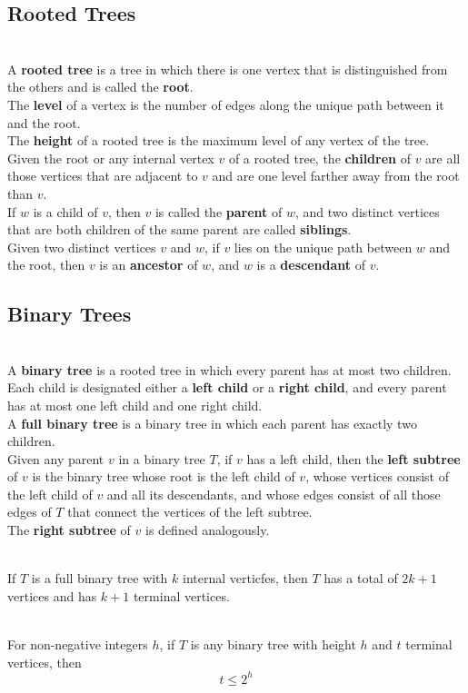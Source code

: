 \documentclass[12pt]{article}
\begin{document}
\subsection{Rooted Trees}
\begin{definition}
\hfill\\
\normalfont A \textbf{rooted tree} is a tree in which there is one vertex that is distinguished from the others and is called the \textbf{root}.\\
The \textbf{level} of a vertex is the number of edges along the unique path between it and the root.\\
The \textbf{height} of a rooted tree is the maximum level of any vertex of the tree.\\
Given the root or any internal vertex $v$ of a rooted tree, the \textbf{children} of $v$ are all those vertices that are adjacent to $v$ and are one level farther away from the root than $v$.\\
If $w$ is a child of $v$, then $v$ is called the \textbf{parent} of $w$, and two distinct vertices that are both children of the same parent are called \textbf{siblings}.\\
Given two distinct vertices $v$ and $w$, if $v$ lies on the unique path between $w$ and the root, then $v$ is an \textbf{ancestor} of $w$, and $w$ is a \textbf{descendant} of $v$.
\end{definition}
\subsection{Binary Trees}
\begin{definition}
\hfill\\
\normalfont A \textbf{binary tree} is a rooted tree in which every parent has at most two children. Each child is designated either a \textbf{left child} or a \textbf{right child}, and every parent has at most one left child and one right child.\\
A \textbf{full binary tree} is a binary tree in which each parent has exactly two children.\\
Given any parent $v$ in a binary tree $T$, if $v$ has a left child, then the \textbf{left subtree} of $v$ is the binary tree whose root is the left child of $v$, whose vertices consist of the left child of $v$ and all its descendants, and whose edges consist of all those edges of $T$ that connect the vertices of the left subtree.\\
The \textbf{right subtree} of $v$ is defined analogously.
\end{definition}
\begin{theorem}
\hfill\\
\normalfont If $T$ is a full binary tree with $k$ internal verticfes, then $T$ has a total of $2k+1$ vertices and has $k+1$ terminal vertices.
\end{theorem}
\begin{theorem}[10.6.2]
\hfill\\
\normalfont For non-negative integers $h$, if $T$ is any binary tree with height $h$ and $t$ terminal vertices, then
\[
t\leq 2^h
\]
\end{theorem}
\end{document}
